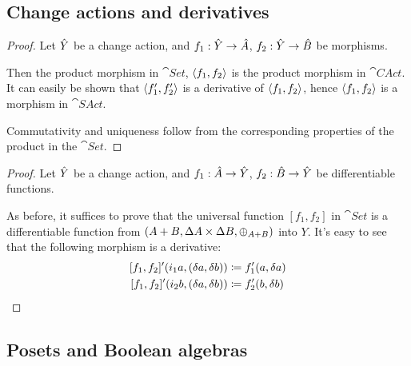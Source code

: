 \subsection{Change actions and derivatives}

\products*
\begin{proof}
  \label{prf:products}
  Let $\hat{Y}$ be a change action, and $f_1: \hat{Y} \rightarrow \hat{A}$, $f_2: \hat{Y}
  \rightarrow \hat{B}$ be morphisms.

  Then the product morphism in $\cat{Set}$, $\left\langle {f_1}, {f_2} \right\rangle$ is the product
  morphism in $\cat{CAct}$. It can easily be
  shown that $\left\langle {f_1'}, {f_2'} \right\rangle$ is a derivative of $\left\langle {f_1}, {f_2} \right\rangle$,
  hence $\left\langle {f_1}, {f_2} \right\rangle$ is a morphism in $\cat{SAct}$.

  Commutativity and uniqueness follow from the corresponding properties of the
  product in the $\cat{Set}$.
\end{proof}

\disjointUnions*
\begin{proof}
  \label{prf:disjointUnions}
  Let $\hat{Y}$ be a change action, and $f_1 : \hat{A} \rightarrow \hat{Y}$, $f_2 : \hat{B}
  \rightarrow \hat{Y}$ be differentiable functions.

  As before, it suffices to prove that the universal function $[f_1, f_2]$ in $\cat{Set}$ is a differentiable
  function from $(A + B,\Delta A \times \Delta B,\oplus_{A + B})$ into $Y$. It's easy to see
  that the following morphism is a derivative:
  \begin{align*}
    \derive{[f_1, f_2]} (i_1 a, (\change{a}, \change{b})) &\defeq f_1'(a, \change{a})\\
    \derive{[f_1, f_2]} (i_2 b, (\change{a}, \change{b})) &\defeq f_2'(b, \change{b})
  \end{align*}
\end{proof}

\subsection{Posets and Boolean algebras}

